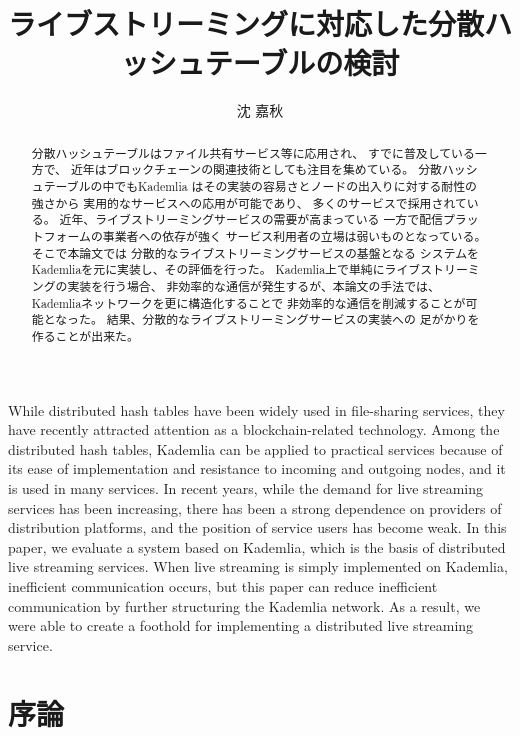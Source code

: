 \documentclass[sotsuron]{jcsie}
\title{ライブストリーミングに対応した分散ハッシュテーブルの検討}
\author{沈 嘉秋}
\begin{document}
\maketitle
\emaketitle
{}
\begin{abstract}    
	分散ハッシュテーブルはファイル共有サービス等に応用され、
	すでに普及している一方で、
	近年はブロックチェーンの関連技術としても注目を集めている。
	分散ハッシュテーブルの中でもKademlia
	はその実装の容易さとノードの出入りに対する耐性の強さから
	実用的なサービスへの応用が可能であり、
	多くのサービスで採用されている。
	近年、ライブストリーミングサービスの需要が高まっている
	一方で配信プラットフォームの事業者への依存が強く
	サービス利用者の立場は弱いものとなっている。
	そこで本論文では
	分散的なライブストリーミングサービスの基盤となる
	システムをKademliaを元に実装し、その評価を行った。
	Kademlia上で単純にライブストリーミングの実装を行う場合、
	非効率的な通信が発生するが、本論文の手法では、
	Kademliaネットワークを更に構造化することで
	非効率的な通信を削減することが可能となった。
	結果、分散的なライブストリーミングサービスの実装への
	足がかりを作ることが出来た。
\end{abstract}
\begin{eabstract}
	While distributed hash tables have been widely used in file-sharing services,
	they have recently attracted attention as a blockchain-related technology. 
	Among the distributed hash tables, 
	Kademlia can be applied to practical services because of 
	its ease of implementation and resistance to incoming and outgoing nodes, 
	and it is used in many services. 
	In recent years, while the demand for live streaming services has been 
	increasing, there has been a strong dependence on providers of distribution 
	platforms, and the position of service users has become weak. 
	In this paper, we evaluate a system based on Kademlia, 
	which is the basis of distributed live streaming services. 
	When live streaming is simply implemented on Kademlia, 
	inefficient communication occurs, but this paper can reduce inefficient 
	communication by further structuring the Kademlia network. 
	As a result, we were able to create a foothold for implementing a 
	distributed live streaming service.
\end{eabstract}
\tableofcontents
{}

\chapter{序論}
\end{document}
